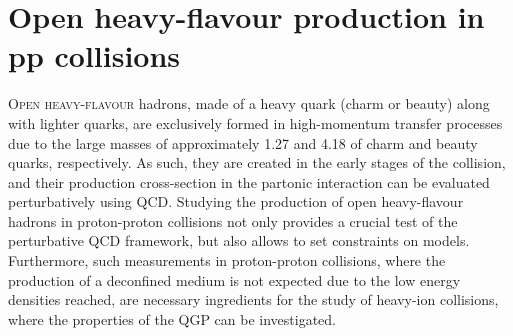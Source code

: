 \chapter{Open heavy-flavour production in pp collisions}

\lettrine[lines=6,findent=0.pt]{O}{pen heavy-flavour} hadrons, made of a heavy quark (charm or beauty) along with lighter quarks, are exclusively formed in high-momentum transfer processes due to the large masses of approximately 1.27 \gevcc and 4.18 \gevcc of charm and beauty quarks, respectively. As such, they are created in the early stages of the collision, and their production cross-section in the partonic interaction can be evaluated perturbatively using QCD. Studying the production of open heavy-flavour hadrons in proton-proton collisions not only provides a crucial test of the perturbative QCD framework, but also allows to set constraints on models. Furthermore, such measurements in proton-proton collisions, where the production of a deconfined medium is not expected due to the low energy densities reached, are necessary ingredients for the study of heavy-ion collisions, where the properties of the QGP can be investigated. 

